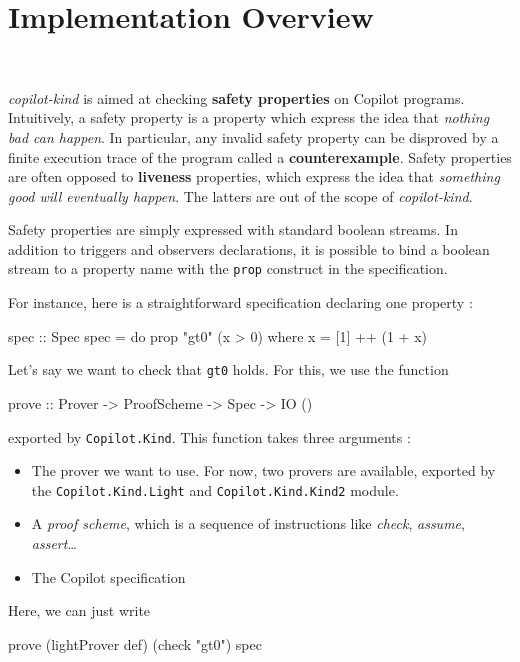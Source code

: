 \section{Implementation Overview}~\label{sec:overview}

\emph{copilot-kind} is aimed at checking \textbf{safety properties} on
Copilot programs. Intuitively, a safety property is a property which
express the idea that \emph{nothing bad can happen}. In particular, any
invalid safety property can be disproved by a finite execution trace of
the program called a \textbf{counterexample}. Safety properties are
often opposed to \textbf{liveness} properties, which express the idea
that \emph{something good will eventually happen}. The latters are out
of the scope of \emph{copilot-kind}.

Safety properties are simply expressed with standard boolean streams. In
addition to triggers and observers declarations, it is possible to bind
a boolean stream to a property name with the \texttt{prop} construct in
the specification.

For instance, here is a straightforward specification declaring one
property :
\begin{code}
spec :: Spec
spec = do
  prop "gt0" (x > 0)
  where
    x = [1] ++ (1 + x)
\end{code}


Let's say we want to check that \texttt{gt0} holds. For this, we use
the function

\begin{code}
    prove :: Prover -> ProofScheme -> Spec -> IO ()
\end{code}

exported by \texttt{Copilot.Kind}. This function takes three
arguments :

\begin{itemize}
\itemsep1pt\parskip0pt
\item
  The prover we want to use. For now, two provers are available,
  exported by the \texttt{Copilot.Kind.Light} and
  \texttt{Copilot.Kind.Kind2} module.
\item
  A \emph{proof scheme}, which is a sequence of instructions like
  \emph{check}, \emph{assume}, \emph{assert}\ldots{}
\item
  The Copilot specification
\end{itemize}

Here, we can just write
\begin{code}
prove (lightProver def) (check "gt0") spec
\end{code}

